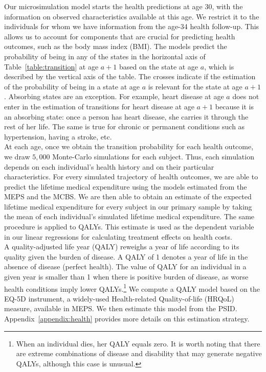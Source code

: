 \noindent Our microsimulation model starts the health predictions at age 30, with the information on observed characteristics available at this age. We restrict it to the individuals for whom we have information from the age-34 health follow-up. This allows us to account for components that are crucial for predicting health outcomes, such as the body mass index (BMI). The models predict the probability of being in any of the states in the horizontal axis of Table~\ref{table:transition} at age $a+1$ based on the state at age $a$, which is described by the vertical axis of the table. The crosses indicate if the estimation of the probability of being in a state at age $a$ is relevant for the state at age $a + 1$. Absorbing states are an exception. For example, heart disease at age $a$ does not enter in the estimation of transitions for heart disease at age $a+1$ because it is an absorbing state: once a person has heart disease, she carries it through the rest of her life. The same is true for chronic or permanent conditions such as hypertension, having a stroke, etc. \\

\noindent At each age, once we obtain the transition probability for each health outcome, we draw $5,000$ Monte-Carlo simulations for each subject. Thus, each simulation depends on each individual's health history and on their particular characteristics. For every simulated trajectory of health outcomes, we are able to predict the lifetime medical expenditure using the models estimated from the MEPS and the MCBS. We are then able to obtain an estimate of the expected lifetime medical expenditure for every subject in our primary sample by taking the mean of each individual's simulated lifetime medical expenditure. The same procedure is applied to QALYs. This estimate is used as the dependent variable in our linear regressions for calculating treatment effects on health costs. \\

\noindent A quality-adjusted life year (QALY) reweighs a year of life according to its quality given the burden of disease. A QALY of 1 denotes a year of life in the absence of disease (perfect health). The value of QALY for an individual in a given year is smaller than 1 when there is positive burden of disease, as worse health conditions imply lower QALYs.\footnote{When an individual dies, her QALY equals zero. It is worth noting that there are extreme combinations of disease and disability that may generate negative QALYs, although this case is unusual.} We compute a QALY model based on the EQ-5D instrument, a widely-used Health-related Quality-of-life (HRQoL) measure, available in MEPS. We then estimate this model from the PSID. Appendix~\ref{appendix:health} provides more details on this estimation strategy. \\

